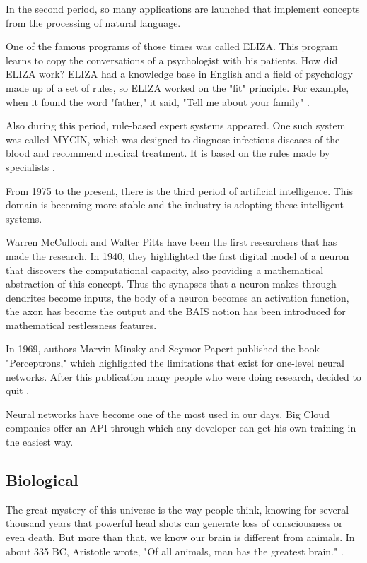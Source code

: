 In the second period, so many applications
 are launched that implement concepts from the processing of natural language.
 
One of the famous programs of those times was called ELIZA. This program learns to copy the conversations of a psychologist with his patients.
How did ELIZA work? 
ELIZA had a knowledge base in English and a field of psychology made up of a set of rules,  
so ELIZA worked on the "fit" principle.
For example, when it found the word "father," it said, "Tell me about your family" \cite{historyofneuronalnetwork}.

 Also during this period, rule-based expert systems appeared. 
One such system was called MYCIN, which was designed to diagnose infectious diseases of the blood and recommend medical treatment. It is based on the rules made by specialists \cite{historyofneuronalnetwork}. 

From 1975 to the present, there is the third period of artificial intelligence. 
This domain is becoming more stable and the industry is adopting these intelligent systems.

Warren McCulloch and Walter Pitts have been the first researchers that has made the research. 
In 1940, they highlighted the first digital model of a neuron that discovers the computational capacity, 
also providing a mathematical abstraction of this concept.
Thus the synapses that a neuron makes through dendrites become inputs, 
the body of a neuron becomes an activation function, the axon has become the output and 
the BAIS notion has been introduced for mathematical restlessness features. \cite{historyofneuronalnetworkstanford}


In 1969, authors Marvin Minsky and Seymor Papert published the book "Perceptrons," which highlighted the limitations that exist for one-level neural networks.
After this publication many people who were doing research, decided to quit \cite{historyofneuronalnetworkstanford}. 

Neural networks have become one of the most used in our days. 
Big Cloud companies offer an API through which any developer can get his own training in the easiest way.
 
\subsection{Biological}

The great mystery of this universe is the way people think, knowing for several 
thousand years that powerful head shots can generate loss of consciousness or even death.
But more than that, we know our brain is different from animals. 
In about 335 BC, Aristotle wrote, "Of all animals, man has the greatest brain." \cite{book.neuronal.network.1995}.

